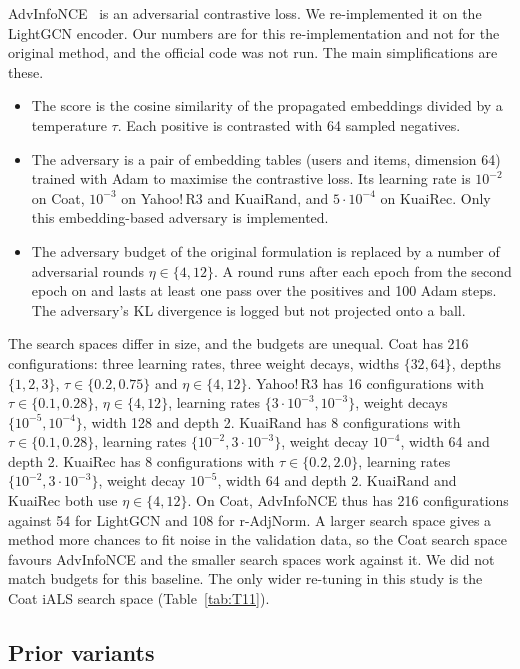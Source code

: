 AdvInfoNCE~\citep{zhang2023advinfonce} is an adversarial contrastive loss. We re-implemented it on the LightGCN
encoder. Our numbers are for this re-implementation and not for the original method, and the official code was
not run. The main simplifications are these.
\begin{itemize}
\item The score is the cosine similarity of the propagated embeddings divided by a temperature $\tau$. Each
positive is contrasted with 64 sampled negatives.
\item The adversary is a pair of embedding tables (users and items, dimension 64) trained with Adam to maximise
the contrastive loss. Its learning rate is $10^{-2}$ on Coat, $10^{-3}$ on Yahoo!\,R3 and KuaiRand, and
$5\cdot10^{-4}$ on KuaiRec. Only this embedding-based adversary is implemented.
\item The adversary budget of the original formulation is replaced by a number of adversarial rounds
$\eta\in\{4,12\}$. A round runs after each epoch from the second epoch on and lasts at least one pass over the
positives and 100 Adam steps. The adversary's KL divergence is logged but not projected onto a ball.
\end{itemize}

The search spaces differ in size, and the budgets are unequal. Coat has 216 configurations: three learning rates, three
weight decays, widths $\{32,64\}$, depths $\{1,2,3\}$, $\tau\in\{0.2,0.75\}$ and $\eta\in\{4,12\}$. Yahoo!\,R3 has
16 configurations with $\tau\in\{0.1,0.28\}$, $\eta\in\{4,12\}$, learning rates $\{3\cdot10^{-3},10^{-3}\}$,
weight decays $\{10^{-5},10^{-4}\}$, width 128 and depth 2. KuaiRand has 8 configurations with
$\tau\in\{0.1,0.28\}$, learning rates $\{10^{-2},3\cdot10^{-3}\}$, weight decay $10^{-4}$, width 64 and depth 2.
KuaiRec has 8 configurations with $\tau\in\{0.2,2.0\}$, learning rates $\{10^{-2},3\cdot10^{-3}\}$, weight decay
$10^{-5}$, width 64 and depth 2. KuaiRand and KuaiRec both use $\eta\in\{4,12\}$. On Coat, AdvInfoNCE thus has 216
configurations against 54 for LightGCN and 108 for r-AdjNorm. A larger search space gives a method more chances to fit
noise in the validation data, so the Coat search space favours AdvInfoNCE and the smaller search spaces work against it. We did
not match budgets for this baseline. The only wider re-tuning in this study is the Coat iALS search space
(Table~\ref{tab:T11}).


\subsection{Prior variants}\label{sec:variants}

